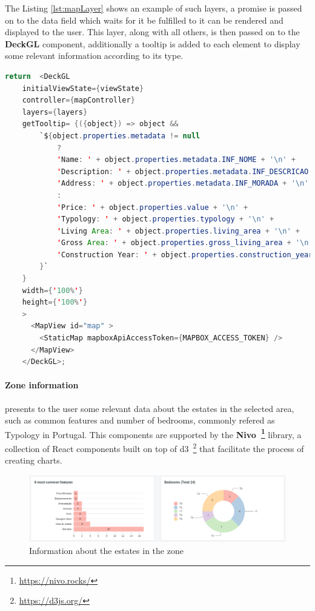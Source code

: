 The Listing \ref{lst:mapLayer} shows an example of such layers, a promise is passed on to the data field which waits for it be fulfilled to it can be rendered and displayed to the user. This layer, along with all others, is then passed on to the \textbf{DeckGL} component, additionally a tooltip is added to each element to display some relevant information according to its type.

\begin{lstlisting}[language=Java, caption={Map JSX returned by the component}, label={lst:mapJSX}]
return  <DeckGL
    initialViewState={viewState}
    controller={mapController}
    layers={layers}
    getTooltip= {({object}) => object &&
        `${object.properties.metadata != null 
            ? 
            'Name: ' + object.properties.metadata.INF_NOME + '\n' +
            'Description: ' + object.properties.metadata.INF_DESCRICAO + '\n' +
            'Address: ' + object.properties.metadata.INF_MORADA + '\n' 
            : 
            'Price: ' + object.properties.value + '\n' +
            'Typology: ' + object.properties.typology + '\n' + 
            'Living Area: ' + object.properties.living_area + '\n' +
            'Gross Area: ' + object.properties.gross_living_area + '\n' +  
            'Construction Year: ' + object.properties.construction_year + '\n'
        }`
    }
    width={'100%'}
    height={'100%'}
    >
      <MapView id="map" >  
        <StaticMap mapboxApiAccessToken={MAPBOX_ACCESS_TOKEN} />
      </MapView>
    </DeckGL>;
\end{lstlisting}

\paragraph{Zone information} presents to the user some relevant data about the estates in the selected area, such as common features and number of bedrooms, commonly refered as Typology in Portugal. This components are supported by the \textbf{Nivo~\footnote{\url{https://nivo.rocks/}}} library, a collection of React components built on top of d3~\footnote{\url{https://d3js.org/}} that facilitate the process of creating charts.

\begin{figure}[h]
	\centering
	\includegraphics[width=1\linewidth]{Chapters/img/frontend/OverviewEstateData.png}
	\caption{Information about the estates in the zone}
	\label{fig:overviewSearchBar}
\end{figure}

